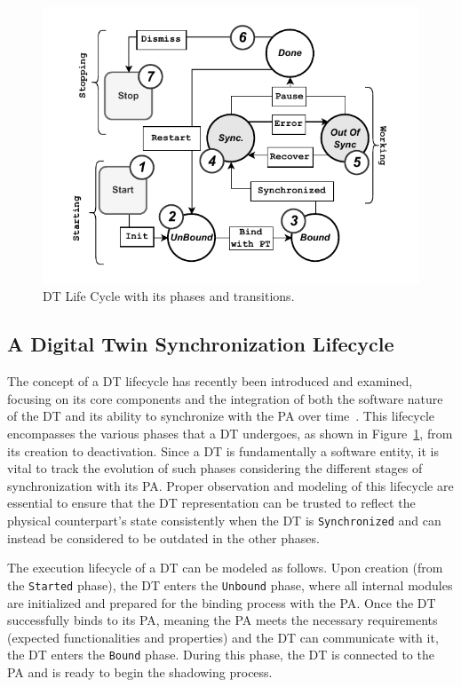 \begin{figure}[t]
    \centering
    \includegraphics[width=\columnwidth]{figures/wldt_lifecycle_simple.pdf}
    \caption{DT Life Cycle with its phases and transitions.}
    \label{fig:dt_life_cycle}
\end{figure}



\subsection{A Digital Twin Synchronization Lifecycle}

The concept of a \ac{DT} lifecycle has recently been introduced and examined, focusing on its core components and the integration of both the software nature of the \ac{DT} and its ability to synchronize with the \ac{PA} over time~\cite{web-of-dt-ricci-2022}.
%
This lifecycle encompasses the various phases that a \ac{DT} undergoes, as shown in Figure~\ref{fig:dt_life_cycle}, from its creation to deactivation.
%
Since a \ac{DT} is fundamentally a software entity, it is vital to track the evolution of such phases considering the different stages of synchronization with its \ac{PA}.
Proper observation and modeling of this lifecycle are essential to ensure that the \ac{DT} representation can be trusted to reflect the physical counterpart's state consistently when the \ac{DT} is \texttt{Synchronized} and can instead be considered to be outdated in the other phases.

The execution lifecycle of a \ac{DT} can be modeled as follows.
Upon creation (from the \texttt{Started} phase),
the \ac{DT} enters the \texttt{Unbound} phase, where all internal modules are initialized and prepared for the binding process with the \ac{PA}.
%
Once the \ac{DT} successfully binds to its \ac{PA},
meaning the \ac{PA} meets the necessary requirements (expected functionalities and properties)
and the \ac{DT} can communicate with it,
the \ac{DT} enters the \texttt{Bound} phase.
%
During this phase, the \ac{DT} is connected to the \ac{PA} and is ready to begin the shadowing process.

